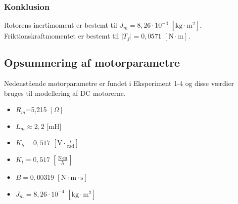 \subsubsection{Konklusion}
Rotorens inertimoment er bestemt til \(J_m=8,26\cdot10^{-4}\) \([\text{kg}\cdot{\text{m}^2}]\).
Friktionskraftmomentet er bestemt til \(\left| { T }_{ f } \right| =0,0571\) \( [\text{N} \cdot \text{m}]\).

\subsection{Opsummering af motorparametre}
\label{opsummering_af_motorparameter}
Nedenstående motorparametre er fundet i Eksperiment 1-4 og disse værdier bruges til modellering af DC motorerne.
\begin{itemize}
\item \(R_m\)=5,215 \([\Omega]\)
\item \(L_m \approx 2,2\) \(\text{[mH]}\)
\item \(K_b = 0,517\) \(\left[ \text{V}\cdot\frac{\text{s}}{\text{rad} }\right] \)
\item \(K_t = 0,517\) \(\left[ \frac{\text{N}\cdot \text{m}}{\text{A}} \right] \)
\item \(B = 0,00319\) \(\left[  \text{N} \cdot \text{m} \cdot \text{s}\right] \)
\item \(J_m = 8,26\cdot10^{-4}\) \(\left[ \text{kg}\cdot{\text{m}^2} \right]  \)
\end{itemize}